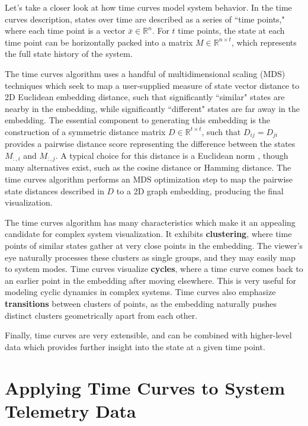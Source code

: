 Let's take a closer look at how time curves model system behavior. In the time curves description, states over time are described as a series of ``time points," where each time point is a vector $\bar{x} \in \mathbb{R}^{n}$. For $t$ time points, the state at each time point can be horizontally packed into a matrix $M \in \mathbb{R}^{n \times t}$, which represents the full state history of the system.

The time curves algorithm uses a handful of multidimensional scaling (MDS) techniques which seek to map a user-supplied measure of state vector distance to 2D Euclidean embedding distance, such that significantly ``similar" states are nearby in the embedding, while significantly ``different" states are far away in the embedding. The essential component to generating this embedding is the construction of a symmetric distance matrix $D \in \mathbb{R}^{t \times t}$, such that $D_{ij} = D_{ji}$ provides a pairwise distance score representing the difference between the states $M_{:,i}$ and $M_{:,j}$. A typical choice for this distance is a Euclidean norm \cite{bach2016time}, though many alternatives exist, such as the cosine distance or Hamming distance. The time curves algorithm performs an MDS optimization step to map the pairwise state distances described in $D$ to a 2D graph embedding, producing the final visualization.

The time curves algorithm has many characteristics which make it an appealing candidate for complex system visualization. It exhibits \textbf{clustering}, where time points of similar states gather at very close points in the embedding. The viewer's eye naturally processes these clusters as single groups, and they may easily map to system modes. Time curves visualize \textbf{cycles}, where a time curve comes back to an earlier point in the embedding after moving elsewhere. This is very useful for modeling cyclic dynamics in complex systems. Time curves also emphasize \textbf{transitions} between clusters of points, as the embedding naturally pushes distinct clusters geometrically apart from each other.

Finally, time curves are very extensible, and can be combined with higher-level data which provides further insight into the state at a given time point.

\section{Applying Time Curves to System Telemetry Data}

